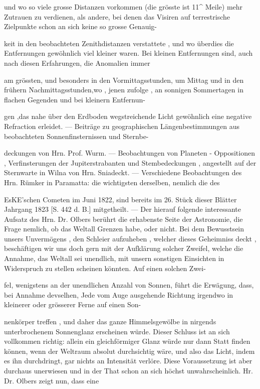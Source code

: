 \documentclass[10pt,a4paper]{article}
\begin{document}
und wo so viele grosse Distanzen vorkommen (die grösste ist 11\textasciicircum{} Meile) mehr Zutrauen zu verdienen, als andere, bei denen das Visiren auf terrestrische Zielpunkte schon an sich keine so grosse Genauig-

keit in den beobachteten Zenithdistanzen verstattete , und wo überdies die Entfernungen gewöhnlich viel kleiner waren. Bei kleinen Entfernungen sind, auch nach diesen Erfahrungen, die Anomalien immer

am grössten, und besonders in den Vormittagsstunden, um Mittag und in den frühern Nachmittagsstunden,wo , jenen zufolge , an sonnigen Sommertagen in flachen Gegenden und bei kleinern Entfernun-

gen ,das nahe über den Erdboden wegstreichende Licht gewöhnlich eine negative Refraction erleidet. — Beiträge zu geographischen Längenbestimmungen aus beobachteten Sonnenfinsternissen und Sternbe-

deckungen von Hrn. Prof. Wurm. — Beobachtungen von Planeten - Oppositionen , Verfinsterungen der Jupiterstrabanten und Stembedeckungen , angestellt auf der Sternwarte in Wilna von Hrn. Sniadeckt. — Verschiedene Beobachtungen des Hrn. Rümker in Paramatta: die wichtigsten derselben, nemlich die des

EsKE'schen Cometen im Juni 1822, sind bereits im 26. Stück dieser Blätter Jahrgang 1823 [S. 442 d. B.] mitgetheilt. — Der hierauf folgende interessante Aufsatz des Hrn. Dr. Olbers berührt die erhabenste Seite der Astronomie, die Frage nemlich, ob das Weltall Grenzen habe, oder nicht. Bei dem Bewusstsein unsers Unvermögens , den Schleier aufzuheben , welcher dieses Geheimniss deckt , beschäftigen wir uns doch gern mit der Aufklärung solcher Zweifel, welche die Annahme, das Weltall sei unendlich, mit unsern sonstigen Einsichten in Widerspruch zu stellen scheinen könnten. Auf einen solchen Zwei-

fel, wenigstens an der unendlichen Anzahl von Sonnen, führt die Erwägung, dass, bei Annahme devselhen, Jede vom Auge ausgehende Richtung irgendwo in kleinerer oder grösserer Ferne auf einen Son-

nenkörper treffen , und daher das ganze Himmelsgewölbe in nirgends unterbrochenem Sonnenglanz erscheinen würde. Dieser Schluss ist an sich vollkommen richtig: allein ein gleichförmiger Glanz würde nur dann Statt finden können, wenn der Weltraum absolut durchsichtig wäre, und also das Licht, indem es ihn durchdringt, gar nichts an Intensität verlöre. Diese Voraussetzung ist aber durchaus unerwiesen und in der That schon an sich höchst unwahrscheinlich. Hr. Dr. Olbers zeigt nun, dass eine
\end{document}

